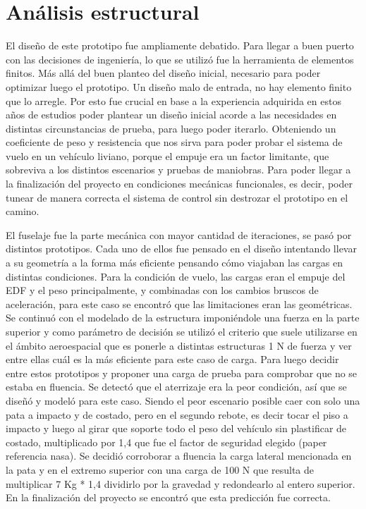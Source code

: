 \section{Análisis estructural}\label{sec:fea}

El diseño de este prototipo fue ampliamente debatido. Para llegar a buen puerto con las decisiones de ingeniería, lo que se utilizó fue la herramienta de elementos finitos. Más allá del buen planteo del diseño inicial, necesario para poder optimizar luego el prototipo. Un diseño malo de entrada, no hay elemento finito que lo arregle. Por esto fue crucial en base a la experiencia adquirida en estos años de estudios poder plantear un diseño inicial acorde a las necesidades en distintas circunstancias de prueba, para luego poder iterarlo. Obteniendo un coeficiente de peso y resistencia que nos sirva para poder probar el sistema de vuelo en un vehículo liviano, porque el empuje era un factor limitante, que sobreviva a los distintos escenarios y pruebas de maniobras. Para poder llegar a la finalización del proyecto en condiciones mecánicas funcionales, es decir, poder tunear de manera correcta el sistema de control sin destrozar el prototipo en el camino.

\medskip

El fuselaje fue la parte mecánica con mayor cantidad de iteraciones, se pasó por distintos prototipos. Cada uno de ellos fue pensado en el diseño intentando llevar a su geometría a la forma más eficiente pensando cómo viajaban las cargas en distintas condiciones. Para la condición de vuelo, las cargas eran el empuje del EDF y el peso  principalmente, y combinadas con los cambios bruscos de aceleración, para este caso se encontró que las limitaciones eran las geométricas. Se continuó con el modelado de la estructura imponiéndole una fuerza en la parte superior y como parámetro de decisión se utilizó el criterio que suele utilizarse en el ámbito aeroespacial que es ponerle a distintas estructuras 1 N de fuerza y ver entre ellas cuál es la más eficiente para este caso de carga. Para luego decidir entre estos prototipos y proponer una carga de prueba para comprobar que no se estaba en fluencia. Se detectó que el aterrizaje era la peor condición, así que se diseñó y modeló para este caso. Siendo el peor escenario posible caer con solo una pata a impacto y de costado, pero en el segundo rebote, es decir tocar el piso a impacto y luego al girar que soporte todo el peso del vehículo sin plastificar de costado, multiplicado por 1,4 que fue el factor de seguridad elegido (paper referencia nasa). Se decidió corroborar a fluencia la carga lateral mencionada en la pata y en el extremo superior con una carga de 100 N que resulta de multiplicar 7 Kg * 1,4 dividirlo por la gravedad y redondearlo al entero superior. En la finalización del proyecto se encontró que esta predicción fue correcta.


